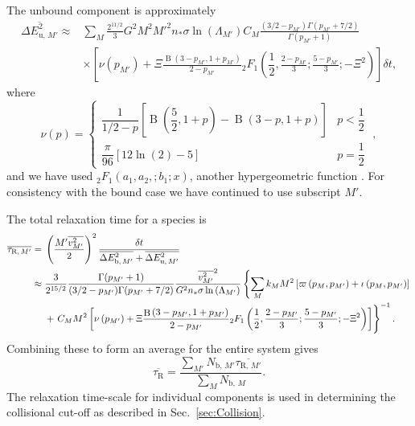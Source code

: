 \documentclass[useAMS,usedcolumn,usegraphicx,usenatbib]{mn2e}
\newcommand{\secref}[1]{Sec.~\ref{sec:#1}}
\DeclareMathOperator{\Beta}{B}
\newcommand{\recip}[1]{\ensuremath{\dfrac{1}{#1}}}
\begin{document}
\begin{onecolumn}
The unbound component is approximately
\begin{align}
\overline{\Delta E^2_{\mathrm{u},\,M'}} \approx {} & \sum_M\frac{2^{11/2}}{3}G^2M^2{M'}^2n_\ast\sigma\ln\left(\Lambda_{M'}\right) C_M \frac{(3/2 - p_{M'})\Gamma(p_{M'} + 7/2)}{\Gamma(p_{M'} + 1)} \nonumber \\
 & \times \left[\nu\left(p_{M'}\right) + \Xi\frac{\Beta\left(3-p_{M'},1+p_{M'}\right)}{2-p_{M'}}{_2F_1}\left(\recip{2},\frac{2-p_{M'}}{3};\frac{5-p_{M'}}{3};-\Xi^2\right) \right] \delta t,
\end{align}
where
\begin{equation}
\nu(p) = \begin{cases} \recip{1/2 - p}\left[\Beta\left(\dfrac{5}{2},1+p\right) - \Beta\left(3-p,1+p\right)\right] & p < \recip{2} \\
\dfrac{\pi}{96}\left[12 \ln(2) - 5\right] & p = \recip{2}
\end{cases} \; ,
\end{equation}
and we have used ${_2F_1}(a_1,a_2,;b_1;x)$, another hypergeometric function \citep[15.6.1]{Olver2010}. For consistency with the bound case we have continued to use subscript $M'$. 

The total relaxation time for a species is
\begin{align}
\overline{\tau_{\mathrm{R,}\,M'}} = {} & \left(\frac{{M'}\overline{v_{M'}^2}}{2}\right)^2\frac{\delta t}{\overline{\Delta E^2_{\mathrm{b},\,M'}} + \overline{\Delta E^2_{\mathrm{u},\,M'}}} \\
 \approx {} & \frac{3}{2^{15/2}}\frac{\Gamma(p_{M'} + 1)}{(3/2 - p_{M'})\Gamma(p_{M'} + 7/2)}\frac{\overline{v_{M'}^2}^2}{G^2n_\ast\sigma\ln\left(\Lambda_{M'}\right)} \left\{\sum_M k_M M^2 \left[ \varpi\left(p_M,p_{M'}\right) + \iota \left(p_M,p_{M'}\right)\right] \right. \nonumber \\*
 & + \left. \vphantom{ \left[ \frac{p_{M'}^2\left(6 + 9p_M + 8p_M^2\right)}{210}\right]} C_M M^2 \left[\nu\left(p_{M'}\right) + \Xi\frac{\Beta\left(3-p_{M'},1+p_{M'}\right)}{2-p_{M'}}{_2F_1}\left(\recip{2},\frac{2-p_{M'}}{3};\frac{5-p_{M'}}{3};-\Xi^2\right)\right]\right\}^{-1}.
\end{align}
Combining these to form an average for the entire system gives
\begin{equation}
\overline{\tau_{\mathrm{R}}} = \frac{\sum_{M'}N_{\mathrm{b,}\,M'}\overline{\tau_{\mathrm{R,}\,M'}}}{\sum_{M}N_{\mathrm{b,}\,M}}.
\label{eq:system-relax}
\end{equation}
The relaxation time-scale for individual components is used in determining the collisional cut-off as described in \secref{Collision}.


\end{onecolumn}
\end{document}
